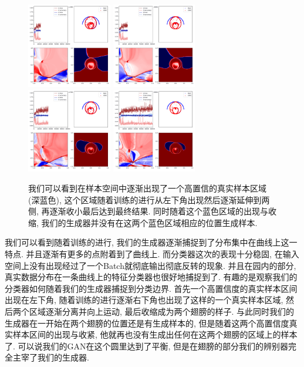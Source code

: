 \documentclass[lang=cn,11pt]{elegantpaper}
\begin{document}
\begin{figure}[hbt]
  \includegraphics[width=0.33\textwidth]{wings_3_5}
  \includegraphics[width=0.33\textwidth]{wings_3_6}\\
  \includegraphics[width=0.33\textwidth]{wings_3_7}
  \includegraphics[width=0.33\textwidth]{wings_3_8}
  \caption{我们可以看到在样本空间中逐渐出现了一个高置信的真实样本区域(深蓝色), 这个区域随着训练的进行从左下角出现然后逐渐延伸到两侧, 再逐渐收小最后达到最终结果. 同时随着这个蓝色区域的出现与收缩, 我们的生成器并没有在这两个蓝色区域相应的位置生成样本.}
\end{figure}

我们可以看到随着训练的进行, 我们的生成器逐渐捕捉到了分布集中在曲线上这一特点. 并且逐渐有更多的点附着到了曲线上. 而分类器这次的表现十分稳固, 在输入空间上没有出现经过了一个Batch就彻底输出彻底反转的现象. 并且在园内的部分, 真实数据分布在一条曲线上的特征分类器也很好地捕捉到了. 有趣的是观察我们的分类器如何随着我们的生成器捕捉到分类边界. 首先一个高置信度的真实样本区间出现在左下角, 随着训练的进行逐渐右下角也出现了这样的一个真实样本区域, 然后两个区域逐渐分离并向上运动, 最后收缩成为两个翅膀的样子. 与此同时我们的生成器在一开始在两个翅膀的位置还是有生成样本的, 但是随着这两个高置信度真实样本区间的出现与收紧, 他就再也没有生成出任何在这两个翅膀的区域上的样本了. 可以说我们的GAN在这个圆里达到了平衡, 但是在翅膀的部分我们的辨别器完全主宰了我们的生成器. 
\end{document}

